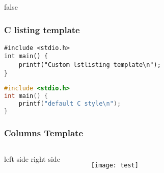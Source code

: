 \documentclass[14pt]{beamer}
\begin{document}
\if false
\begin{frame}[fragile] %
\frametitle{C listing template}
\begin{lstlisting}[style=CStyle]
#include <stdio.h>
int main() {
	printf("Custom lstlisting template\n");
}
\end{lstlisting}

\begin{lstlisting}[language=c]
#include <stdio.h>
int main() {
	printf("default C style\n");
}
\end{lstlisting}
\end{frame}

\begin{frame}
\frametitle{Columns Template}
\begin{columns}
\column{1.5in}
left side
\column{1.5in}
right side
\begin{figure}
\texttt{[image: test]}
\end{figure}
\end{columns}
\end{frame}
\fi
\end{document}
